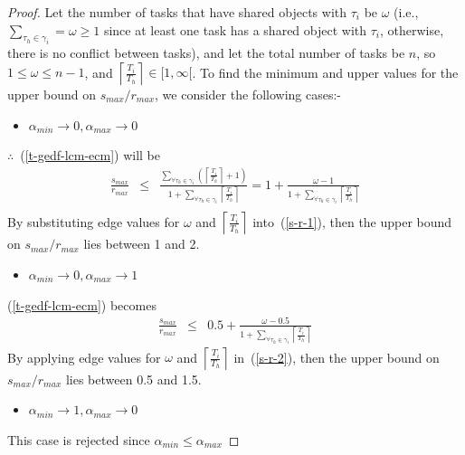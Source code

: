 \documentclass[conference]{IEEEtran}
\begin{document}
\begin{proof}
Let the number of tasks that have shared objects with $\tau_i$ be $\omega$ (i.e., $\sum_{\tau_h \in \gamma_i}=\omega \ge 1$ since at least one task has a shared object with $\tau_i$, otherwise, there is no conflict between tasks), and let the total number of tasks be $n$, so $1\le \omega \le n-1$, and $\left\lceil\frac{T_i}{T_h}\right\rceil \in [1,\infty[$. To find the minimum and upper values for the upper bound on $s_{max}/r_{max}$, we consider the following cases:-
\begin{itemize}
\item $\alpha_{min} \rightarrow 0, \alpha_{max} \rightarrow 0$
\end{itemize}
$\therefore$~(\ref{t-gedf-lcm-ecm}) will be
\begin{eqnarray}
\frac{s_{max}}{r_{max}} & \le & \frac{{\sum_{\forall \tau_{h}\in\gamma_{i}}\left(\left\lceil\frac{T_{i}}{T_{h}}\right\rceil+1\right)}}{{1+\sum_{\forall \tau_{h}\in\gamma_{i}}\left\lceil\frac{T_{i}}{T_{h}}\right\rceil}}
 =  1+\frac{\omega-1}{1+\sum_{\forall \tau_h \in \gamma_i}\left\lceil\frac{T_i}{T_h}\right\rceil}\nonumber\\
\label{s-r-1}\end{eqnarray}
By substituting edge values for $\omega$ and $\left\lceil\frac{T_i}{T_h}\right\rceil$ into~(\ref{s-r-1}), then the upper bound on $s_{max}/r_{max}$ lies between 1 and 2.

\begin{itemize}
\item $\alpha_{min} \rightarrow 0, \alpha_{max} \rightarrow 1$
\end{itemize}
(\ref{t-gedf-lcm-ecm}) becomes
\begin{eqnarray}
\frac{s_{max}}{r_{max}} & \le & 0.5+ \frac{\omega - 0.5}{1+\sum_{\forall \tau_h \in \gamma_i}\left\lceil\frac{T_i}{T_h}\right\rceil}
\label{s-r-2}\end{eqnarray}
By applying edge values for $\omega$ and $\left\lceil\frac{T_i}{T_h}\right\rceil$ in~(\ref{s-r-2}), then the upper bound on $s_{max}/r_{max}$ lies between 0.5 and 1.5.

\begin{itemize}
\item $\alpha_{min} \rightarrow 1, \alpha_{max} \rightarrow 0$
\end{itemize}
This case is rejected since $\alpha_{min} \le \alpha_{max}$


\end{proof}
\end{document}
